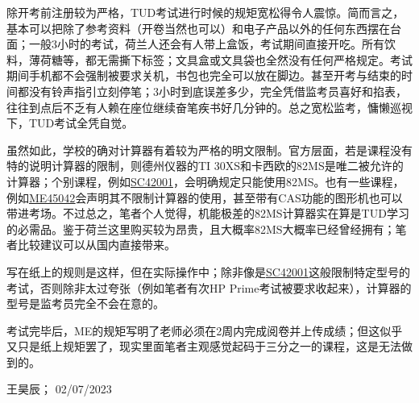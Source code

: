 除开考前注册较为严格，TUD考试进行时候的规矩宽松得令人震惊。简而言之，基本可以把除了参考资料（开卷当然也可以）和电子产品以外的任何东西摆在台面；一般3小时的考试，荷兰人还会有人带上盒饭，考试期间直接开吃。所有饮料，薄荷糖等，都无需撕下标签；文具盒或文具袋也全然没有任何严格规定。考试期间手机都不会强制被要求关机，书包也完全可以放在脚边。甚至开考与结束的时间都没有铃声指引立刻停笔；3小时到底误差多少，完全凭借监考员喜好和掐表，往往到点后不乏有人赖在座位继续奋笔疾书好几分钟的。总之宽松监考，慵懒巡视下，TUD考试全凭自觉。

虽然如此，学校的确对计算器有着较为严格的明文限制。官方层面，若是课程没有特的说明计算器的限制，则德州仪器的TI 30XS和卡西欧的82MS是唯二被允许的计算器；个别课程，例如\hyperlink{control}{\uline{SC42001}}，会明确规定只能使用82MS。也有一些课程，例如\hyperlink{AFD}{\uline{ME45042}}会声明其不限制计算器的使用，甚至带有CAS功能的图形机也可以带进考场。不过总之，笔者个人觉得，机能极差的82MS计算器实在算是TUD学习的必需品。鉴于荷兰这里购买较为昂贵，且大概率82MS大概率已经曾经拥有；笔者比较建议可以从国内直接带来。

写在纸上的规则是这样，但在实际操作中；除非像是\hyperlink{control}{\uline{SC42001}}这般限制特定型号的考试，否则除非太过夸张（例如笔者有次HP Prime考试被要求收起来），计算器的型号是监考员完全不会在意的。

考试完毕后，ME的规矩写明了老师必须在2周内完成阅卷并上传成绩；但这似乎又只是纸上规矩罢了，现实里面笔者主观感觉起码于三分之一的课程，这是无法做到的。
\begin{flushright}
王昊辰； 02/07/2023
\end{flushright}

